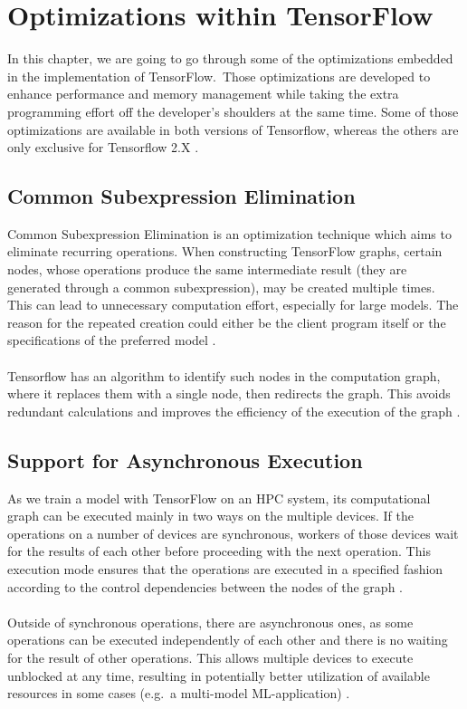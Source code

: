 \documentclass[ieeetran]{article}
\begin{document}
\section{Optimizations within TensorFlow} %
\label{sec:optimizations_tensorflow}
In this chapter, we are going to go through some of the optimizations embedded in the implementation of TensorFlow.\ Those optimizations are developed to enhance performance and memory management while taking the extra programming effort off the developer's shoulders at the same time. Some of those optimizations are available in both versions of Tensorflow, whereas the others are only exclusive for Tensorflow 2.X \cite{first}.

\subsection{Common Subexpression Elimination} %
\label{sub:common_subexpression_elimination}
Common Subexpression Elimination is an optimization technique which aims to eliminate recurring operations. When constructing TensorFlow graphs, certain nodes, whose operations produce the same intermediate result (they are generated through a common subexpression), may be created multiple times. This can lead to unnecessary computation effort, especially for large models. The reason for the repeated creation could either be the client program itself or the specifications of the preferred model \cite{first}.
\\ \\Tensorflow has an algorithm to identify such nodes in the computation graph, where it replaces them with a single node, then redirects the graph. This avoids redundant calculations and improves the efficiency of the execution of the graph \cite{first}.

\subsection{Support for Asynchronous Execution} %
\label{sub:support_for_asynchronous_kernels}
As we train a model with TensorFlow on an HPC system, its computational graph can be executed mainly in two ways on the multiple devices. If the operations on a number of devices are synchronous, workers of those devices wait for the results of each other before proceeding with the next operation. This execution mode ensures that the operations are executed in a specified fashion according to the control dependencies between the nodes of the graph \cite{first} \cite{fifth}.
\\ \\Outside of synchronous operations, there are asynchronous ones, as some operations can be executed independently of each other and there is no waiting for the result of other operations. This allows multiple devices to execute unblocked at any time, resulting in potentially better utilization of available resources in some cases (e.g.\ a multi-model ML-application) \cite{fifth}.
\end{document}
